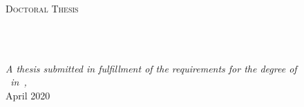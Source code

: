 \documentclass[11pt,english,doublespacing,liststotoc,tocbibind,headsepline]{MastersDoctoralThesis}\usepackage[]{graphicx}\usepackage[]{color}
\author{Tom Mitchell Elliott} %
\begin{document}
\frontmatter %

\pagestyle{plain} %


\begin{titlepage}
\begin{center}

\vspace*{.06\textheight}
{\scshape\LARGE \univname\par}\vspace{1.5cm} %
\textsc{\Large Doctoral Thesis}\\[0.5cm] %

\HRule \\[0.4cm] %
{\huge \bfseries \ttitle\par}\vspace{0.4cm} %
\HRule \\[1.5cm] %


\Large\authorname %

\vfill

\large \textit{A thesis submitted in fulfillment of the requirements %
for the degree of\\ \degreename\ in\ \subjectname, \univname}\\[0.3cm]



\vspace{1cm}
{\large April 2020}%

\vfill
\end{center}
\end{titlepage}

\end{document}
